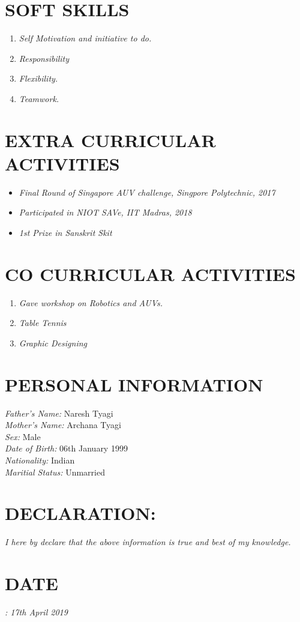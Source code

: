 \documentclass[margin]{res}
\begin{document}
\begin{resume}
\section{SOFT SKILLS }\begin{enumerate}
\item{\sl Self Motivation and initiative to do.}
\item{\sl Responsibility}
\item{\sl Flexibility.}
\item{\sl Teamwork.}
\end{enumerate}

\section{EXTRA CURRICULAR ACTIVITIES}\begin{itemize}
\item{\sl Final Round of Singapore AUV challenge, Singpore Polytechnic, 2017}
\item{\sl Participated in NIOT SAVe, IIT Madras, 2018}
\item{\sl 1st Prize in Sanskrit Skit}
\end{itemize}

\section{CO CURRICULAR ACTIVITIES}\begin{enumerate}
\item{\sl Gave workshop on Robotics and AUVs.}
\item{\sl Table Tennis}
\item{\sl Graphic Designing}
\end{enumerate}


\section{PERSONAL INFORMATION}
{\sl Father's Name:} Naresh Tyagi\\
{\sl Mother's Name:} Archana Tyagi\\
{\sl Sex:} Male\\
{\sl Date of Birth:} 06th January 1999\\
{\sl Nationality:} Indian\\
{\sl Maritial Status:} Unmarried\\

\section{DECLARATION: } 
{\sl I here by declare that the above information is true and best of my knowledge.}

 \section{DATE}
 {\sl : 17th April 2019}

\end{resume}
\end{document}
